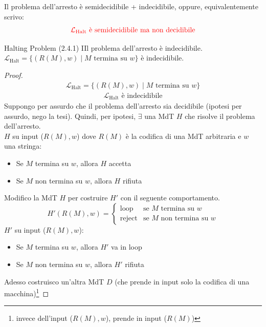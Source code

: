 \documentclass{article}  %
\theoremstyle{definition}
\begin{document}
Il problema dell'arresto è semidecidibile + indecidibile, oppure, equivalentemente scrivo:
\begin{align*}
  \textcolor{red}{\mathcal{L}_{\text{Halt}} \text{ è semidecidibile ma non decidibile}}
\end{align*}

\begin{theorem}{Halting Problem (2.4.1)} 
  IIl problema dell'arresto è indecidibile. \\
  $\mathcal{L}_{\text{Halt}} = \{(R(M),w) \mid M \text{ termina su } w\}$ è indecidibile.
  \footnotesize %
  \begin{proof}
    \begin{align*}
      \mathcal{L}_{\text{Halt}} = \{(R(M),w) \mid M \text{ termina su } w\} \tag*{(ipotesi)}
    \end{align*}
    \begin{align*}
      \mathcal{L}_{\text{Halt}} \text{ è indecidibile} \tag*{(tesi)}
    \end{align*}
    Suppongo per assurdo che il problema dell'arresto sia decidibile (ipotesi per assurdo, nego la tesi).
    Quindi, per ipotesi, $\exists$ una MdT $H$ che risolve il problema dell'arresto. \\
    $H$ su input ($R(M),w$) dove $R(M)$ è la codifica di una MdT arbitraria e $w$ una stringa:
    \begin{itemize}
      \item Se $M$ termina su $w$, allora $H$ accetta
      \item Se $M$ non termina su $w$, allora $H$ rifiuta
    \end{itemize}
    Modifico la MdT $H$ per costruire $H'$ con il seguente 
    comportamento. 
    \[
    H'(R(M),w) =
    \begin{cases}
      \text{loop} & \text{se } M \text{ termina su } w\\
      \text{reject} & \text{se } M \text{  non termina su } w
    \end{cases}
    \]
    $H'$ su input ($R(M),w$): 
    \begin{itemize}
      \item Se $M$ termina su $w$, allora $H'$ va in loop
      \item Se $M$ non termina su $w$, allora $H'$ rifiuta
    \end{itemize}
    Adesso costruisco un'altra MdT $D$ (che prende in input solo la codifica di una macchina)\footnote{invece dell'input
     ($R(M),w$), prende in input ($R(M)$)} 

\end{proof}
\end{theorem}
\end{document}
